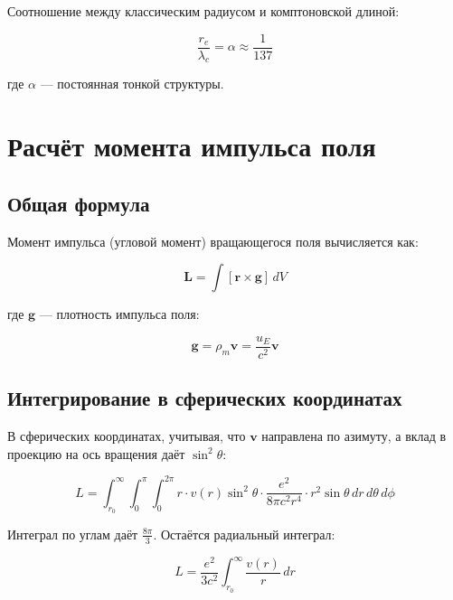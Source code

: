 \documentclass[12pt,a4paper]{article}
\begin{document}
Соотношение между классическим радиусом и комптоновской длиной:

\begin{equation}
    \frac{r_e}{\lambda_c} = \alpha \approx \frac{1}{137}
\end{equation}

где $\alpha$ --- постоянная тонкой структуры.

\section{Расчёт момента импульса поля}

\subsection{Общая формула}

Момент импульса (угловой момент) вращающегося поля вычисляется как:

\begin{equation}
    \mathbf{L} = \int [\mathbf{r} \times \mathbf{g}] \, dV
\end{equation}

где $\mathbf{g}$ --- плотность импульса поля:

\begin{equation}
    \mathbf{g} = \rho_m \mathbf{v} = \frac{u_E}{c^2} \mathbf{v}
\end{equation}

\subsection{Интегрирование в сферических координатах}

В сферических координатах, учитывая, что $\mathbf{v}$ направлена по азимуту, а вклад в проекцию на ось вращения даёт $\sin^2\theta$:

\begin{equation}
    L = \int_{r_0}^{\infty} \int_{0}^{\pi} \int_{0}^{2\pi} r \cdot v(r) \sin^2\theta \cdot \frac{e^2}{8\pi c^2 r^4} \cdot r^2 \sin\theta \, dr \, d\theta \, d\phi
\end{equation}

Интеграл по углам даёт $\frac{8\pi}{3}$. Остаётся радиальный интеграл:

\begin{equation}
    L = \frac{e^2}{3 c^2} \int_{r_0}^{\infty} \frac{v(r)}{r} \, dr
\end{equation}
\end{document}
